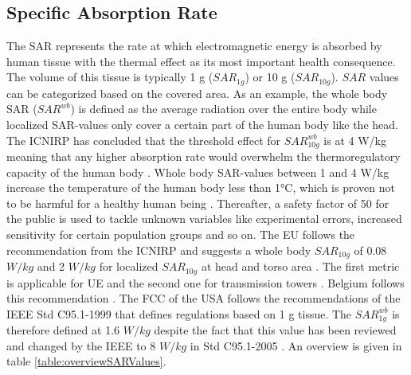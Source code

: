 \subsection{Specific Absorption Rate}
The \gls{SAR} represents the rate at which electromagnetic energy is 
absorbed by human tissue with the thermal effect as its most important health consequence.
The volume of this tissue is typically 1 g ($SAR_{1g}$) or 10 g ($SAR_{10g}$). 
$SAR$ values can be categorized based on the covered area. As an example, 
the whole body \gls{SAR} ($SAR^{wb}$) is defined as the average radiation over the entire body while
localized \gls{SAR}-values only cover a certain part of the human body like the head.
The \gls{ICNIRP} has concluded that the threshold effect for $SAR^{wb}_{10g}$ is at 4 W/kg meaning that any higher absorption 
rate would overwhelm the \gls{thermoregulatory capacity} of the human body \cite{J23,J24}.
Whole body \gls{SAR}-values between 1 and 4 W/kg increase the temperature of the human body less than 1°C, which is proven not to be harmful 
for a healthy human being \cite{J24,P2}.
Thereafter, a safety factor of 50 for the public \cite{J23} is used to tackle unknown variables like experimental errors, increased sensitivity for certain population groups and so on. 
The \gls{EU} follows the recommendation from the \gls{ICNIRP} \cite{J23} and 
suggests a whole body $SAR_{10g}$ of 0.08 $W/kg$ and 2 $W/kg$ for localized $SAR_{10g}$ at head and torso area \cite{J31_bioeffects,J30}. 
The first metric is applicable for \gls{UE} and the second one for transmission towers \cite{S20}.
Belgium follows this recommendation \cite{J23,S13_normenBelgie}.
The \gls{FCC} of the \gls{USA} follows the recommendations of the \gls{IEEE} Std C95.1-1999 \cite{P1,P2} that defines 
regulations based on 1 g tissue.
The $SAR^{wb}_{1g}$ is therefore defined at 1.6 $W/kg$ despite the fact that this value has been reviewed and changed by the \gls{IEEE} to 8 $W/kg$ in Std C95.1-2005 \cite{P2}.
An overview is given in table \ref{table:overviewSARValues}.


